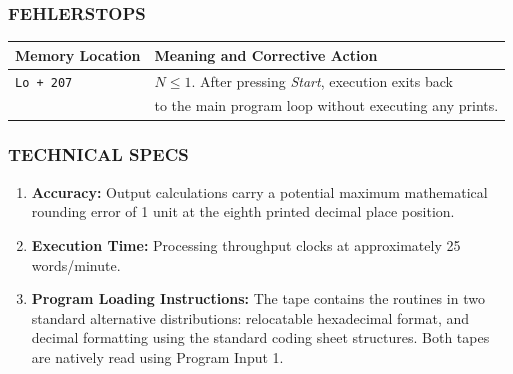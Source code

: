 \subsubsection*{FEHLERSTOPS}
\begin{center}
\begin{tabular}{ll}
    \toprule
    \textbf{Memory Location} & \textbf{Meaning and Corrective Action} \\
    \midrule
    \texttt{Lo + 207}        & $N \le 1$. After pressing \textit{Start}, execution exits back \\
                             & to the main program loop without executing any prints. \\
    \bottomrule
\end{tabular}
\end{center}

\subsubsection*{TECHNICAL SPECS}
\begin{enumerate}
    \item \textbf{Accuracy:} Output calculations carry a potential maximum mathematical rounding error of 1 unit at the eighth printed decimal place position.
    \item \textbf{Execution Time:} Processing throughput clocks at approximately 25 words/minute.
    \item \textbf{Program Loading Instructions:} The tape contains the routines in two standard alternative distributions: relocatable hexadecimal format, and decimal formatting using the standard coding sheet structures. Both tapes are natively read using Program Input 1.
\end{enumerate}
\newpage
